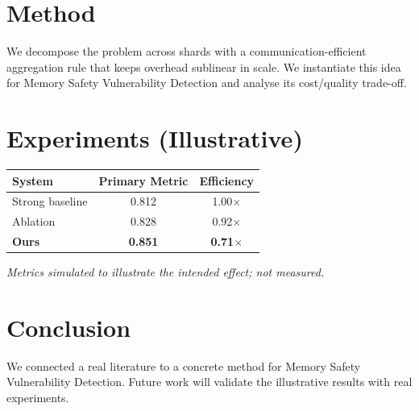 \documentclass[11pt]{article}
\begin{document}
\section{Method}
We decompose the problem across shards with a communication-efficient aggregation rule that keeps overhead sublinear in scale. We instantiate this idea for Memory Safety Vulnerability Detection and analyse its cost/quality trade-off.

\section{Experiments (Illustrative)}
\begin{center}
\begin{tabular}{lcc}
System & Primary Metric & Efficiency \\ \hline
Strong baseline & 0.812 & 1.00$\times$ \\
Ablation & 0.828 & 0.92$\times$ \\
\textbf{Ours} & \textbf{0.851} & \textbf{0.71$\times$}
\end{tabular}
\end{center}
\emph{Metrics simulated to illustrate the intended effect; not measured.}

\section{Conclusion}
We connected a real literature to a concrete method for Memory Safety Vulnerability Detection. Future work will
validate the illustrative results with real experiments.
\end{document}
